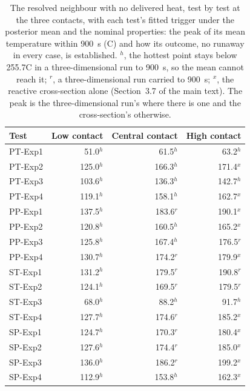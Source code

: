 \begin{table}[!htbp]
\centering
\footnotesize
\caption{The resolved neighbour with no delivered heat, test by test at the three contacts, with each test's fitted trigger under the posterior mean and the nominal properties: the peak of its mean temperature within 900~s (\textdegree C) and how its outcome, no runaway in every case, is established. $^{h}$, the hottest point stays below 255.7\textdegree C in a three-dimensional run to 900~s, so the mean cannot reach it; $^{r}$, a three-dimensional run carried to 900~s; $^{x}$, the reactive cross-section alone (Section~3.7 of the main text). The peak is the three-dimensional run's where there is one and the cross-section's otherwise.}
\label{tab:s-nodelivery}
\setlength{\tabcolsep}{6pt}
\begin{tabular}{lrrr}
\toprule
Test & Low contact & Central contact & High contact \\
\midrule
PT-Exp1 & 51.0$^{h}$ & 61.5$^{h}$ & 63.2$^{h}$ \\
PT-Exp2 & 125.0$^{h}$ & 166.3$^{h}$ & 171.4$^{x}$ \\
PT-Exp3 & 103.6$^{h}$ & 136.3$^{h}$ & 142.7$^{h}$ \\
PT-Exp4 & 119.1$^{h}$ & 158.1$^{h}$ & 162.7$^{x}$ \\
PP-Exp1 & 137.5$^{h}$ & 183.6$^{r}$ & 190.1$^{x}$ \\
PP-Exp2 & 120.8$^{h}$ & 160.5$^{h}$ & 165.2$^{x}$ \\
PP-Exp3 & 125.8$^{h}$ & 167.4$^{h}$ & 176.5$^{r}$ \\
PP-Exp4 & 130.7$^{h}$ & 174.2$^{r}$ & 179.9$^{x}$ \\
ST-Exp1 & 131.2$^{h}$ & 179.5$^{r}$ & 190.8$^{r}$ \\
ST-Exp2 & 124.1$^{h}$ & 169.5$^{r}$ & 179.5$^{r}$ \\
ST-Exp3 & 68.0$^{h}$ & 88.2$^{h}$ & 91.7$^{h}$ \\
ST-Exp4 & 127.7$^{h}$ & 174.6$^{r}$ & 185.2$^{x}$ \\
SP-Exp1 & 124.7$^{h}$ & 170.3$^{r}$ & 180.4$^{x}$ \\
SP-Exp2 & 127.6$^{h}$ & 174.4$^{r}$ & 185.0$^{x}$ \\
SP-Exp3 & 136.0$^{h}$ & 186.2$^{r}$ & 199.2$^{x}$ \\
SP-Exp4 & 112.9$^{h}$ & 153.8$^{h}$ & 162.3$^{x}$ \\
\bottomrule
\end{tabular}
\end{table}
